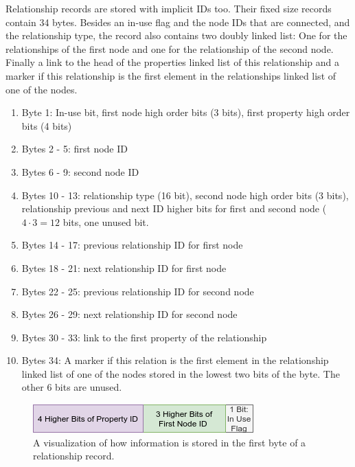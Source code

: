 \documentclass[a4paper,10pt]{article}
\begin{document}
    Relationship records are stored with implicit IDs too. Their fixed size records contain 34 bytes. Besides an in-use flag and the node IDs that are connected, and the relationship type, the record also contains two doubly linked list: One for the relationships of the first node and one for the relationship of the second node. Finally a link to the head of the properties linked list of this relationship and a marker if this relationship is the first element in the relationships linked list of one of the nodes.
    \newpage
    \begin{enumerate}
     \item Byte 1: In-use bit, first node high order bits (3 bits), first property high order bits (4 bits)
     \item Bytes 2 - 5: first node ID 
     \item Bytes 6 - 9: second node ID 
     \item Bytes 10 - 13: relationship type (16 bit), second node high order bits (3 bits), relationship previous and next ID higher bits for first and second node ($4 \cdot 3 = 12$ bits, one unused bit.
     \item Bytes 14 - 17: previous relationship ID for first node
     \item Bytes 18 - 21: next relationship ID for first node
     \item Bytes 22 - 25: previous relationship ID for second node
     \item Bytes 26 - 29: next relationship ID for second node
     \item Bytes 30 - 33: link to the first property of the relationship
     \item Bytes 34: A marker if this relation is the first element in the relationship linked list of one of the nodes stored in the lowest two bits of the byte. The other 6 bits are unused.
    \end{enumerate}


\begin{figure}[htp]\label{rel_first_byte}
 \begin{center}
  \includegraphics[keepaspectratio,width=\textwidth]{img/03_record/relationship/relationship_first_byte.png}
 \end{center}
 \caption{A visualization of how information is stored in the first byte of a relationship record.} %
\end{figure}
\end{document}
